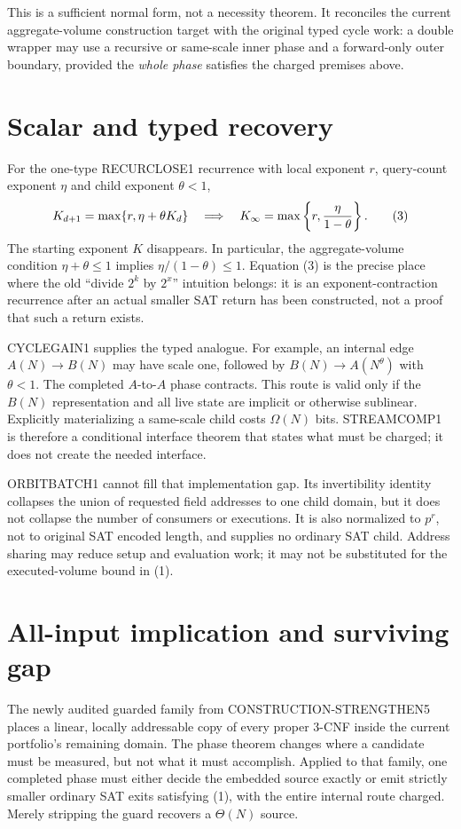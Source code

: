 \documentclass[11pt]{article}
\begin{document}
This is a sufficient normal form, not a necessity theorem.  It reconciles
the current aggregate-volume construction target with the original typed
cycle work: a double wrapper may use a recursive or same-scale inner phase
and a forward-only outer boundary, provided the \emph{whole phase} satisfies
the charged premises above.

\section{Scalar and typed recovery}
For the one-type RECURCLOSE1 recurrence with local exponent $r$, query-count
exponent $\eta$ and child exponent $\theta<1$,
\[
 K_{d+1}=\max\{r,\eta+\theta K_d\}
 \quad\Longrightarrow\quad
 K_\infty=\max\left\{r,{\eta\over1-\theta}\right\}. \tag{3}
\]
The starting exponent $K$ disappears.  In particular, the aggregate-volume
condition $\eta+\theta\le1$ implies
$\eta/(1-\theta)\le1$.  Equation (3) is the precise place where the old
``divide $2^k$ by $2^x$'' intuition belongs: it is an exponent-contraction
recurrence after an actual smaller SAT return has been constructed, not a
proof that such a return exists.

CYCLEGAIN1 supplies the typed analogue.  For example, an internal edge
$A(N)\to B(N)$ may have scale one, followed by
$B(N)\to A(N^\theta)$ with $\theta<1$.  The completed $A$-to-$A$ phase
contracts.  This route is valid only if the $B(N)$ representation and all
live state are implicit or otherwise sublinear.  Explicitly materializing a
same-scale child costs $\Omega(N)$ bits.  STREAMCOMP1 is therefore a
conditional interface theorem that states what must be charged; it does not
create the needed interface.

ORBITBATCH1 cannot fill that implementation gap.  Its invertibility identity
collapses the union of requested field addresses to one child domain, but it
does not collapse the number of consumers or executions.  It is also
normalized to $p^r$, not to original SAT encoded length, and supplies no
ordinary SAT child.  Address sharing may reduce setup and evaluation work;
it may not be substituted for the executed-volume bound in (1).

\section{All-input implication and surviving gap}
The newly audited guarded family from CONSTRUCTION-STRENGTHEN5 places a
linear, locally addressable copy of every proper 3-CNF inside the current
portfolio's remaining domain.  The phase theorem changes where a candidate
must be measured, but not what it must accomplish.  Applied to that family,
one completed phase must either decide the embedded source exactly or emit
strictly smaller ordinary SAT exits satisfying (1), with the entire internal
route charged.  Merely stripping the guard recovers a $\Theta(N)$ source.
\end{document}
